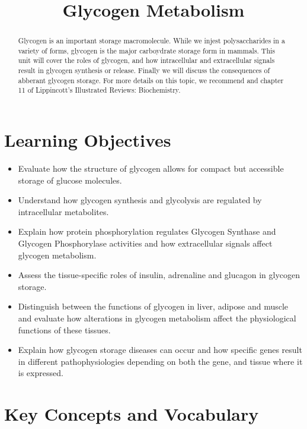 \documentclass{tufte-handout}
\title{Glycogen Metabolism}
\author{}
\date{}  %
\begin{document}
\maketitle%

\begin{abstract}
\noindent Glycogen is an important storage macromolecule.  While we injest polysaccharides in a variety of forms, glycogen is the major carboydrate storage form in mammals.  This unit will cover the roles of glycogen, and how intracellular and extracellular signals result in glycogen synthesis or release.  Finally we will discuss the consequences of abberant glycogen storage.  For more details on this topic, we recommend \citet{Bollen1998} and chapter 11 of Lippincott's Illustrated Reviews: Biochemistry\cite{Ferrier2017}.
\end{abstract}

\tableofcontents
\pagebreak
\section{Learning Objectives}

\begin{itemize}
\item Evaluate how the structure of glycogen allows for compact but accessible storage of glucose molecules.
\item Understand how glycogen synthesis and glycolysis are regulated by intracellular metabolites.
\item Explain how protein phosphorylation regulates Glycogen Synthase and Glycogen Phosphorylase activities and how extracellular signals affect glycogen metabolism.
\item Assess the tissue-specific roles of insulin, adrenaline and glucagon in glycogen storage.
\item Distinguish between the functions of glycogen in liver, adipose and muscle and evaluate how alterations in glycogen metabolism affect the physiological functions of these tissues.
\item Explain how glycogen storage diseases can occur and how specific genes result in different pathophysiologies depending on both the gene, and tissue where it is expressed.
\end{itemize}

\section{Key Concepts and Vocabulary}
\end{document}
